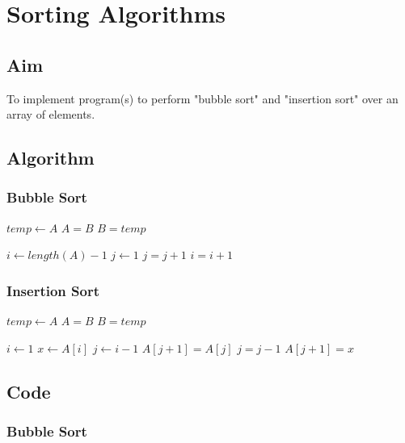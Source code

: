 \chapter{Sorting Algorithms}

\section{Aim}

To implement program(s) to perform "bubble sort" and "insertion sort" over an array of elements.

\section{Algorithm}

\subsection{Bubble Sort}
\begin{algorithmic}[1]
		\State $temp \gets A$
		\State $A = B$
		\State $B = temp$
	\EndFunction

		\State $i \gets length(A) - 1$
			\State $j \gets 1$
					\State {}
				\EndIf
				\State $j = j + 1$
			\EndWhile
			\State $i = i + 1$
		\EndWhile
	\EndFunction
\end{algorithmic}


\subsection{Insertion Sort}
\begin{algorithmic}[1]
		\State $temp \gets A$
		\State $A = B$
		\State $B = temp$
	\EndFunction

		\State $i \gets 1$
			\State $x \gets A[i]$
			\State $j \gets i-1$
				\State $A[j+1] = A[j]$
				\State $j = j - 1$
			\EndWhile
			\State $A[j+1] = x$
		\EndWhile
	\EndFunction
\end{algorithmic}

\section{Code}

\subsection{Bubble Sort}

